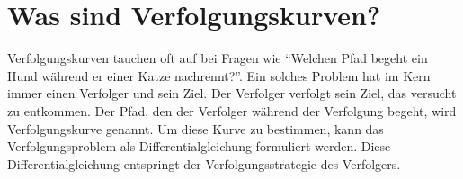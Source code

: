 %
%
%
\section{Was sind Verfolgungskurven?
\label{lambertw:section:Was_sind_Verfolgungskurven}}
%
Verfolgungskurven tauchen oft auf bei Fragen wie ``Welchen Pfad begeht ein Hund während er einer Katze nachrennt?''.
%
%
Ein solches Problem hat im Kern immer einen Verfolger und sein Ziel.
%
%
Der Verfolger verfolgt sein Ziel, das versucht zu entkommen.
Der Pfad, den der Verfolger während der Verfolgung begeht, wird Verfolgungskurve genannt.
Um diese Kurve zu bestimmen, kann das Verfolgungsproblem als Differentialgleichung formuliert werden.
Diese Differentialgleichung entspringt der Verfolgungsstrategie des Verfolgers.
%
